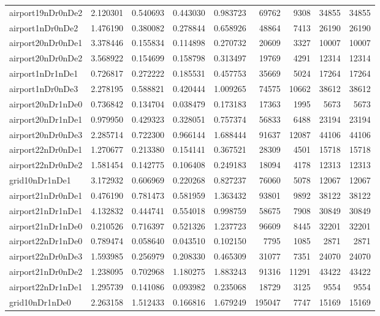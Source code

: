 \begin{longtable}{|l|r|r|r|r|r|r|r|r|}
airport19nDr0nDe2 & 2.120301 & 0.540693 & 0.443030 & 0.983723 & 69762 & 9308 & 34855 & 34855 \\
airport1nDr0nDe2 & 1.476190 & 0.380082 & 0.278844 & 0.658926 & 48864 & 7413 & 26190 & 26190 \\
airport20nDr0nDe1 & 3.378446 & 0.155834 & 0.114898 & 0.270732 & 20609 & 3327 & 10007 & 10007 \\
airport20nDr0nDe2 & 3.568922 & 0.154699 & 0.158798 & 0.313497 & 19769 & 4291 & 12314 & 12314 \\
airport1nDr1nDe1 & 0.726817 & 0.272222 & 0.185531 & 0.457753 & 35669 & 5024 & 17264 & 17264 \\
airport1nDr0nDe3 & 2.278195 & 0.588821 & 0.420444 & 1.009265 & 74575 & 10662 & 38612 & 38612 \\
airport20nDr1nDe0 & 0.736842 & 0.134704 & 0.038479 & 0.173183 & 17363 & 1995 & 5673 & 5673 \\
airport20nDr1nDe1 & 0.979950 & 0.429323 & 0.328051 & 0.757374 & 56833 & 6488 & 23194 & 23194 \\
airport20nDr0nDe3 & 2.285714 & 0.722300 & 0.966144 & 1.688444 & 91637 & 12087 & 44106 & 44106 \\
airport22nDr0nDe1 & 1.270677 & 0.213380 & 0.154141 & 0.367521 & 28309 & 4501 & 15718 & 15718 \\
airport22nDr0nDe2 & 1.581454 & 0.142775 & 0.106408 & 0.249183 & 18094 & 4178 & 12313 & 12313 \\
grid10nDr1nDe1 & 3.172932 & 0.606969 & 0.220268 & 0.827237 & 76060 & 5078 & 12067 & 12067 \\
airport21nDr0nDe1 & 0.476190 & 0.781473 & 0.581959 & 1.363432 & 93801 & 9892 & 38122 & 38122 \\
airport21nDr1nDe1 & 4.132832 & 0.444741 & 0.554018 & 0.998759 & 58675 & 7908 & 30849 & 30849 \\
airport21nDr1nDe0 & 0.210526 & 0.716397 & 0.521326 & 1.237723 & 96609 & 8445 & 32201 & 32201 \\
airport22nDr1nDe0 & 0.789474 & 0.058640 & 0.043510 & 0.102150 & 7795 & 1085 & 2871 & 2871 \\
airport22nDr0nDe3 & 1.593985 & 0.256979 & 0.208330 & 0.465309 & 31077 & 7351 & 24070 & 24070 \\
airport21nDr0nDe2 & 1.238095 & 0.702968 & 1.180275 & 1.883243 & 91316 & 11291 & 43422 & 43422 \\
airport22nDr1nDe1 & 1.295739 & 0.141086 & 0.093982 & 0.235068 & 18729 & 3125 & 9554 & 9554 \\
grid10nDr1nDe0 & 2.263158 & 1.512433 & 0.166816 & 1.679249 & 195047 & 7747 & 15169 & 15169 \\

\end{longtable}
